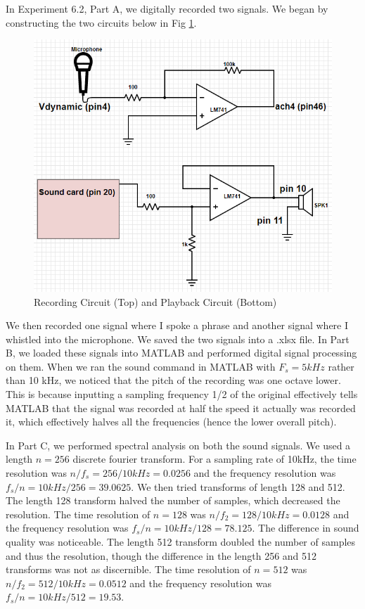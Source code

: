 \documentclass[10pt]{article}
\begin{document}
In Experiment 6.2, Part A, we digitally recorded two signals. We began by constructing the two circuits below in Fig \ref{fig:circuit}.

\begin{centering}
	\begin{figure} [H]
		\centering
		\includegraphics[scale=0.5]{images/circuit.png}
		\caption{Recording Circuit (Top) and Playback Circuit (Bottom)}
		\label{fig:circuit}
	\end{figure}
\end{centering}

We then recorded one signal where I spoke a phrase and another signal where I whistled into the microphone. We saved the two signals into a .xlsx file. In Part B, we loaded these signals into MATLAB and performed digital signal processing on them. When we ran the sound command in MATLAB with $F_s = 5 kHz$ rather than 10 kHz, we noticed that the pitch of the recording was one octave lower. This is because inputting a sampling frequency 1/2 of the original effectively tells MATLAB that the signal was recorded at half the speed it actually was recorded it, which effectively halves all the frequencies (hence the lower overall pitch). 

In Part C, we performed spectral analysis on both the sound signals. We used a length $n=256$ discrete fourier transform. For a sampling rate of 10kHz, the time resolution was $n/f_s = 256/10kHz = 0.0256$ and the frequency resolution was $f_s/n = 10kHz/256 = 39.0625$. We then tried transforms of length 128 and 512. The length 128 transform halved the number of samples, which decreased the resolution. The time resolution of $n=128$ was $n/f_2 = 128/10kHz = 0.0128$ and the frequency resolution was $f_s/n = 10kHz/128 = 78.125$. The difference in sound quality was noticeable. The length 512 transform doubled the number of samples and thus the resolution, though the difference in the length 256 and 512 transforms was not as discernible.  The time resolution of $n=512$ was $n/f_2 = 512/10kHz = 0.0512$ and the frequency resolution was $f_s/n = 10kHz/512 = 19.53$.
\end{document}
